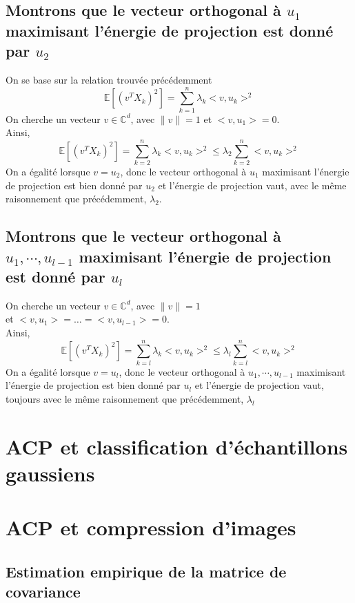 \documentclass{report}
\begin{document}
		\subsection{Montrons que le vecteur orthogonal à $u_1$ maximisant l'énergie de projection est donné par $u_2$}
			On se base sur la relation trouvée précédemment
			\[ \mathbb{E}[(v^TX_k)^2] = \sum\limits_{k=1}^n \lambda_k<v, u_k>^2 \]
			On cherche un vecteur $v \in \mathbb{C}^d$, avec $\lVert v \rVert = 1$ et $<v, u_1> = 0$. \\
			Ainsi, 
			\[ \mathbb{E}[(v^TX_k)^2] = \sum\limits_{k=2}^n \lambda_k<v, u_k>^2 \leq \lambda_2\sum\limits_{k=2}^n <v, u_k>^2 \]
			On a égalité lorsque $v=u_2$, donc le vecteur orthogonal à $u_1$ maximisant l'énergie de projection est bien donné par $u_2$ et l'énergie de projection vaut, avec le même raisonnement que précédemment, $\lambda_2$.
		\subsection{Montrons que le vecteur orthogonal à $u_1, \cdots, u_{l-1}$ maximisant l'énergie de projection est donné par $u_l$}
			On cherche un vecteur $v \in \mathbb{C}^d$, avec $\lVert v \rVert = 1$ \\
			et $<v, u_1> = \ldots = <v, u_{l-1}> = 0$. \\
			Ainsi, 
			\[ \mathbb{E}[(v^TX_k)^2] = \sum\limits_{k=l}^n \lambda_k<v, u_k>^2 \leq \lambda_l\sum\limits_{k=l}^n <v, u_k>^2 \]
			On a égalité lorsque $v=u_l$, donc le vecteur orthogonal à $u_1, \cdots, u_{l-1}$ maximisant l'énergie de projection est bien donné par $u_l$ et l'énergie de projection vaut, toujours avec le même raisonnement que précédemment, $\lambda_l$

	\section{ACP et classification d'échantillons gaussiens}
	\section{ACP et compression d'images}
		\subsection{Estimation empirique de la matrice de covariance}
\end{document}
